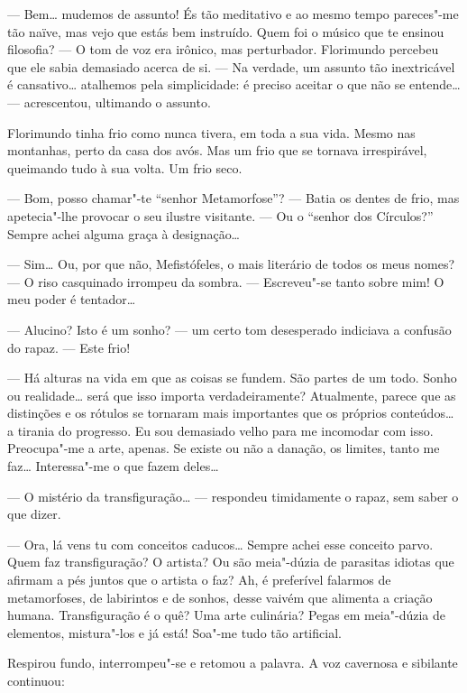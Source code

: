 --- Bem\ldots{} mudemos de assunto! És tão meditativo e ao mesmo tempo
pareces"-me tão naïve, mas vejo que estás bem instruído. Quem foi o
músico que te ensinou filosofia? --- O tom de voz era irônico, mas
perturbador. Florimundo percebeu que ele sabia demasiado acerca de si. ---
Na verdade, um assunto tão inextricável é cansativo\ldots{} atalhemos pela
simplicidade: é preciso aceitar o que não se entende\ldots{} --- acrescentou,
ultimando o assunto.

Florimundo tinha frio como nunca tivera, em toda a sua vida. Mesmo nas
montanhas, perto da casa dos avós. Mas um frio que se tornava
irrespirável, queimando tudo à sua volta. Um frio seco.

--- Bom, posso chamar"-te ``senhor Metamorfose''? ---  Batia os dentes de frio,
mas apetecia"-lhe provocar o seu ilustre visitante. --- Ou o ``senhor dos
Círculos?'' Sempre achei alguma graça à designação\ldots{}

--- Sim\ldots{} Ou, por que não, Mefistófeles, o mais literário de todos os
meus nomes? --- O riso casquinado irrompeu da sombra. --- Escreveu"-se tanto
sobre mim! O meu poder é tentador\ldots{}

--- Alucino? Isto é um sonho? --- um certo tom desesperado indiciava a
confusão do rapaz. --- Este frio!

--- Há alturas na vida em que as coisas se fundem. São partes de um todo.
Sonho ou realidade\ldots{} será que isso importa verdadeiramente?
Atualmente, parece que as distinções e os rótulos se tornaram mais
importantes que os próprios conteúdos\ldots{} a tirania do progresso. Eu sou
demasiado velho para me incomodar com isso. Preocupa"-me a arte, apenas.
Se existe ou não a danação, os limites, tanto me faz\ldots{} Interessa"-me o
que fazem deles\ldots{}

--- O mistério da transfiguração\ldots{} --- respondeu timidamente o rapaz, sem
saber o que dizer.

--- Ora, lá vens tu com conceitos caducos\ldots{} Sempre achei esse conceito
parvo. Quem faz transfiguração? O artista? Ou são meia"-dúzia de
parasitas idiotas que afirmam a pés juntos que o artista o faz? Ah, é
preferível falarmos de metamorfoses, de labirintos e de sonhos, desse
vaivém que alimenta a criação humana. Transfiguração é o quê? Uma arte
culinária? Pegas em meia"-dúzia de elementos, mistura"-los e já está!
Soa"-me tudo tão artificial.

Respirou fundo, interrompeu"-se e retomou a palavra. A voz cavernosa e
sibilante continuou:

